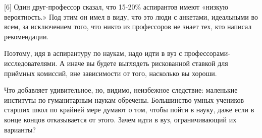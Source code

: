 \documentclass[ebook,12pt,oneside,openany]{memoir}
\begin{document}
[6] Один друг-профессор сказал, что 15-20\% аспирантов имеют «низкую
вероятность.» Под этим он имел в виду, что это люди с анкетами,
идеальными во всем, за исключением того, что никто из профессоров не
знает тех, кто написал рекомендации.

Поэтому, идя в аспирантуру по наукам, надо идти в вуз с
профессорами-исследователями. А иначе вы будете выглядеть рискованной
ставкой для приёмных комиссий, вне зависимости от того, насколько вы
хороши.

Что добавляет удивительное, но, видимо, неизбежное следствие:
маленькие институты по гуманитарным наукам обречены. Большинство умных
учеников старших школ по крайней мере думают о том, чтобы пойти в
науку, даже если в конце концов отказывается от этого. Зачем идти в
вуз, ограничивающий их варианты?
\end{document}
